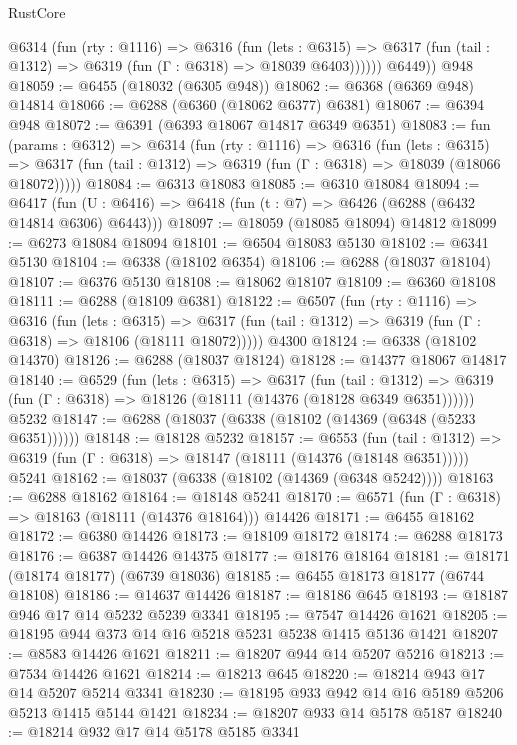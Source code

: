 \begin{lexlean}{RustCore}
\begin{coremodule}
          @6314
            (fun (rty : @1116) =>
            @6316
              (fun (lets : @6315) =>
              @6317 (fun (tail : @1312) => @6319 (fun (Γ : @6318) => @18039 @6403))))))
        @6449))
    @948
@18059 := @6455 (@18032 (@6305 @948))
@18062 := @6368 (@6369 @948) @14814
@18066 := @6288 (@6360 (@18062 @6377) @6381)
@18067 := @6394 @948
@18072 := @6391 (@6393 @18067 @14817 @6349 @6351)
@18083 := fun (params : @6312) =>
  @6314
    (fun (rty : @1116) =>
    @6316
      (fun (lets : @6315) =>
      @6317 (fun (tail : @1312) => @6319 (fun (Γ : @6318) => @18039 (@18066 @18072)))))
@18084 := @6313 @18083
@18085 := @6310 @18084
@18094 := @6417
    (fun (U : @6416) => @6418 (fun (t : @7) => @6426 (@6288 (@6432 @14814 @6306) @6443)))
@18097 := @18059 (@18085 @18094) @14812
@18099 := @6273 @18084 @18094
@18101 := @6504 @18083 @5130
@18102 := @6341 @5130
@18104 := @6338 (@18102 @6354)
@18106 := @6288 (@18037 @18104)
@18107 := @6376 @5130
@18108 := @18062 @18107
@18109 := @6360 @18108
@18111 := @6288 (@18109 @6381)
@18122 := @6507
    (fun (rty : @1116) =>
    @6316
      (fun (lets : @6315) =>
      @6317 (fun (tail : @1312) => @6319 (fun (Γ : @6318) => @18106 (@18111 @18072)))))
    @4300
@18124 := @6338 (@18102 @14370)
@18126 := @6288 (@18037 @18124)
@18128 := @14377 @18067 @14817
@18140 := @6529
    (fun (lets : @6315) =>
    @6317
      (fun (tail : @1312) =>
      @6319 (fun (Γ : @6318) => @18126 (@18111 (@14376 (@18128 @6349 @6351))))))
    @5232
@18147 := @6288 (@18037 (@6338 (@18102 (@14369 (@6348 (@5233 @6351))))))
@18148 := @18128 @5232
@18157 := @6553
    (fun (tail : @1312) => @6319 (fun (Γ : @6318) => @18147 (@18111 (@14376 (@18148 @6351)))))
    @5241
@18162 := @18037 (@6338 (@18102 (@14369 (@6348 @5242))))
@18163 := @6288 @18162
@18164 := @18148 @5241
@18170 := @6571 (fun (Γ : @6318) => @18163 (@18111 (@14376 @18164))) @14426
@18171 := @6455 @18162
@18172 := @6380 @14426
@18173 := @18109 @18172
@18174 := @6288 @18173
@18176 := @6387 @14426 @14375
@18177 := @18176 @18164
@18181 := @18171 (@18174 @18177) (@6739 @18036)
@18185 := @6455 @18173 @18177 (@6744 @18108)
@18186 := @14637 @14426
@18187 := @18186 @645
@18193 := @18187 @946 @17 @14 @5232 @5239 @3341
@18195 := @7547 @14426 @1621
@18205 := @18195 @944 @373 @14 @16 @5218 @5231 @5238 @1415 @5136 @1421
@18207 := @8583 @14426 @1621
@18211 := @18207 @944 @14 @5207 @5216
@18213 := @7534 @14426 @1621
@18214 := @18213 @645
@18220 := @18214 @943 @17 @14 @5207 @5214 @3341
@18230 := @18195 @933 @942 @14 @16 @5189 @5206 @5213 @1415 @5144 @1421
@18234 := @18207 @933 @14 @5178 @5187
@18240 := @18214 @932 @17 @14 @5178 @5185 @3341

\end{coremodule}
\end{lexlean}
